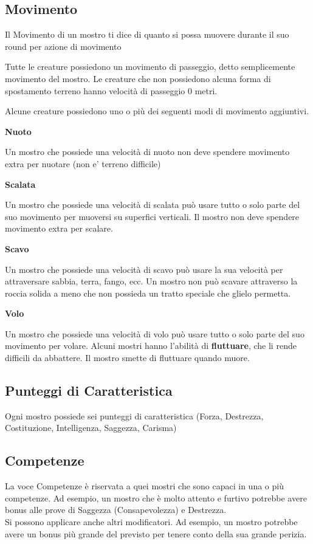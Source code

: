 \subsection{Movimento}

Il Movimento di un mostro ti dice di quanto si possa muovere durante il suo round per azione di movimento

Tutte le creature possiedono un movimento di passeggio, detto semplicemente movimento del mostro. Le creature che non possiedono alcuna forma di spostamento terreno hanno velocità di passeggio 0 metri.

Alcune creature possiedono uno o più dei seguenti modi di movimento aggiuntivi.

\medskip\textbf{Nuoto}

Un mostro che possiede una velocità di nuoto non deve spendere movimento extra per nuotare (non e' terreno difficile)

\medskip\textbf{Scalata}

Un mostro che possiede una velocità di scalata può usare tutto o solo parte del suo movimento per muoversi su superfici verticali. Il mostro non deve spendere movimento extra per scalare.

\medskip\textbf{Scavo}

Un mostro che possiede una velocità di scavo può usare la sua velocità per attraversare sabbia, terra, fango, ecc. Un mostro non può scavare attraverso la roccia solida a meno che non possieda un tratto speciale che glielo permetta.

\medskip\textbf{Volo}

Un mostro che possiede una velocità di volo può usare tutto o solo parte del suo movimento per volare. Alcuni mostri hanno l'abilità di \textbf{fluttuare}, che li rende difficili da abbattere. Il mostro smette di fluttuare quando muore.

\subsection{Punteggi di Caratteristica}

Ogni mostro possiede sei punteggi di caratteristica (Forza, Destrezza, Costituzione, Intelligenza, Saggezza, Carisma)

\subsection{Competenze}

La voce Competenze è riservata a quei mostri che sono capaci in una o più competenze. Ad esempio, un mostro che è molto attento e furtivo potrebbe avere bonus alle prove di Saggezza (Consapevolezza) e Destrezza. \\
Si possono applicare anche altri modificatori. Ad esempio, un mostro potrebbe avere un bonus più grande del previsto per tenere conto della sua grande perizia.

